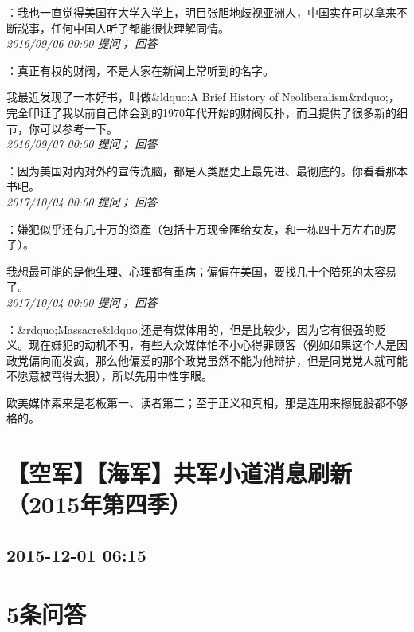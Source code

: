 \documentclass[twocolumn]{ctexart}
\begin{document}
：我也一直觉得美国在大学入学上，明目张胆地歧视亚洲人，中国实在可以拿来不断説事，任何中国人听了都能很快理解同情。\\

\textit{\hfill\noindent\small 2016/09/06 00:00 提问； 回答}

：真正有权的财阀，不是大家在新闻上常听到的名字。

我最近发现了一本好书，叫做\&ldquo;A Brief History of Neoliberalism\&rdquo;，完全印证了我以前自己体会到的1970年代开始的财阀反扑，而且提供了很多新的细节，你可以参考一下。\\

\textit{\hfill\noindent\small 2016/09/07 00:00 提问； 回答}

：因为美国对内对外的宣传洗脑，都是人类歷史上最先进、最彻底的。你看看那本书吧。\\

\textit{\hfill\noindent\small 2017/10/04 00:00 提问； 回答}

：嫌犯似乎还有几十万的资產（包括十万现金匯给女友，和一栋四十万左右的房子）。

我想最可能的是他生理、心理都有重病；偏偏在美国，要找几十个陪死的太容易了。\\

\textit{\hfill\noindent\small 2017/10/04 00:00 提问； 回答}

：\&rdquo;Massacre\&ldquo;还是有媒体用的，但是比较少，因为它有很强的贬义。现在嫌犯的动机不明，有些大众媒体怕不小心得罪顾客（例如如果这个人是因政党偏向而发疯，那么他偏爱的那个政党虽然不能为他辩护，但是同党党人就可能不愿意被骂得太狠），所以先用中性字眼。

欧美媒体素来是老板第一、读者第二；至于正义和真相，那是连用来擦屁股都不够格的。\\


\section{【空军】【海军】共军小道消息刷新（2015年第四季）}
\subsection{2015-12-01 06:15}


\section{5条问答}
\end{document}
